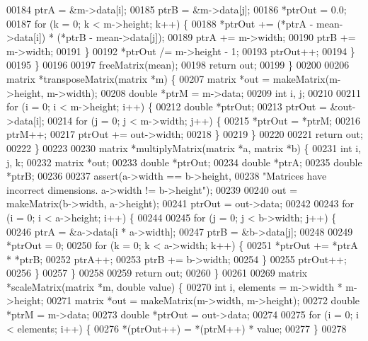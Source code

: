 \begin{DoxyCode}
{{{00184       ptrA = &m->data[i];
00185       ptrB = &m->data[j];
00186       *ptrOut = 0.0;
00187       \textcolor{keywordflow}{for} (k = 0; k < m->height; k++) \{
00188         *ptrOut += (*ptrA - mean->data[i]) * (*ptrB - mean->data[j]);
00189         ptrA += m->width;
00190         ptrB += m->width;
00191       \}
00192       *ptrOut /= m->height - 1;
00193       ptrOut++;
00194     \}
00195   \}
00196 
00197   freeMatrix(mean);
00198   \textcolor{keywordflow}{return} out;
00199 \}
00200 
00206 matrix *transposeMatrix(matrix *m) \{
00207   matrix *out = makeMatrix(m->height, m->width);
00208   \textcolor{keywordtype}{double} *ptrM = m->data;
00209   \textcolor{keywordtype}{int} i, j;
00210 
00211   \textcolor{keywordflow}{for} (i = 0; i < m->height; i++) \{
00212     \textcolor{keywordtype}{double} *ptrOut;
00213     ptrOut = &out->data[i];
00214     \textcolor{keywordflow}{for} (j = 0; j < m->width; j++) \{
00215       *ptrOut = *ptrM;
00216       ptrM++;
00217       ptrOut += out->width;
00218     \}
00219   \}
00220 
00221   \textcolor{keywordflow}{return} out;
00222 \}
00223 
00230 matrix *multiplyMatrix(matrix *a, matrix *b) \{
00231   \textcolor{keywordtype}{int} i, j, k;
00232   matrix *out;
00233   \textcolor{keywordtype}{double} *ptrOut;
00234   \textcolor{keywordtype}{double} *ptrA;
00235   \textcolor{keywordtype}{double} *ptrB;
00236 
00237   assert(a->width == b->height,
00238          \textcolor{stringliteral}{"Matrices have incorrect dimensions. a->width != b->height"});
00239 
00240   out = makeMatrix(b->width, a->height);
00241   ptrOut = out->data;
00242 
00243   \textcolor{keywordflow}{for} (i = 0; i < a->height; i++) \{
00244 
00245     \textcolor{keywordflow}{for} (j = 0; j < b->width; j++) \{
00246       ptrA = &a->data[i * a->width];
00247       ptrB = &b->data[j];
00248 
00249       *ptrOut = 0;
00250       \textcolor{keywordflow}{for} (k = 0; k < a->width; k++) \{
00251         *ptrOut += *ptrA * *ptrB;
00252         ptrA++;
00253         ptrB += b->width;
00254       \}
00255       ptrOut++;
00256     \}
00257   \}
00258 
00259   \textcolor{keywordflow}{return} out;
00260 \}
00261 
00269 matrix *scaleMatrix(matrix *m, \textcolor{keywordtype}{double} value) \{
00270   \textcolor{keywordtype}{int} i, elements = m->width * m->height;
00271   matrix *out = makeMatrix(m->width, m->height);
00272   \textcolor{keywordtype}{double} *ptrM = m->data;
00273   \textcolor{keywordtype}{double} *ptrOut = out->data;
00274 
00275   \textcolor{keywordflow}{for} (i = 0; i < elements; i++) \{
00276     *(ptrOut++) = *(ptrM++) * value;
00277   \}
00278 
}}}
\end{DoxyCode}

